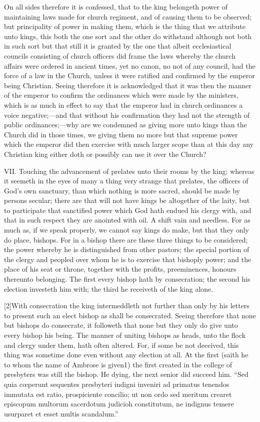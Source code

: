 On all sides therefore it is confessed, that to the king belongeth power of maintaining laws made for church regiment,  and of causing them to be observed; but principality of power in making them, which is the thing that we attribute unto kings, this both the one sort and the other do withstand although not both in such sort but that still it is granted by the one that albeit ecclesiastical councils consisting of church officers did frame the laws whereby the church affairs were ordered in ancient times, yet no canon, no not of any council, had the force of a law in the Church, unless it were ratified and confirmed by the emperor being Christian. Seeing therefore it is acknowledged that it was then the manner of the emperor to confirm the ordinances which were made by the ministers, which is as much in effect to say that the emperor  had in church ordinances a voice negative;—and that without his confirmation they had not the strength of public ordinances;—why are we condemned as giving more unto kings than the Church did in those times, we giving them no more but that supreme power which the emperor did then exercise with much larger scope than at this day any Christian king either doth or possibly can use it over the Church?

VII. Touching the advancement of prelates unto their rooms by the king; whereas it seemeth in the eyes of many a thing very strange that prelates, the officers of God’s own sanctuary, than which nothing is more sacred, should be made by persons secular; there are that will not have kings be altogether of the laity, but to participate that sanctified power which God hath endued his clergy with, and that in such respect they are anointed with oil. A shift vain and needless. For as much as, if we speak properly, we cannot say kings do make, but that they only do place, bishops. For in a bishop there are these three things to be considered; the power whereby he is distinguished from other pastors; the special portion of the clergy and peopled over whom he is to exercise that bishoply power; and the place of his seat or throne, together with the profits, preeminences, honours thereunto belonging. The first every bishop hath by consecration; the second his election investeth him with; the third he receiveth of the king alone.

[2]With consecration the king intermeddleth not further than only by his letters to present such an elect bishop as shall be consecrated. Seeing therefore that none but bishops do consecrate, it followeth that none but they only do give unto every bishop his being. The manner of uniting bishops as heads, unto the flock and clergy under them, hath often  altered. For, if some be not deceived, this thing was sometime done even without any election at all. At the first (saith he to whom the name of Ambrose is given1) the first created in the college of presbyters was still the bishop. He dying, the next senior did succeed him. “Sed quia cœperunt sequentes presbyteri indigni inveniri ad primatus tenendos immutata est ratio, prospiciente concilio; ut non ordo sed meritum crearet episcopum multorum sacerdotum judicioh constitutum, ne indignus temere usurparet et esset multis scandalum.”

